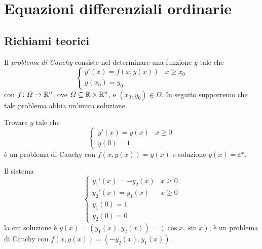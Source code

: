 \chapter{Equazioni differenziali ordinarie}

\section{Richiami teorici}
	
	\noindent Il \emph{problema di Cauchy} consiste nel determinare una funzione \(y\) tale che
	\begin{equation}\label{eq:problema-cauchy}
		\begin{cases}
			y' (x) = f (x, y(x)) & x \ge x_0 \\
			y (x_0) = y_0
		\end{cases}
	\end{equation}
	con \(f \colon \varOmega \to \mathbb{R}^n\), ove \(\varOmega \subseteq \mathbb{R} \times \mathbb{R}^n\), e \((x_0, y_0) \in \varOmega\). In seguito supporremo che tale problema abbia un'unica soluzione.
	
	\begin{esempio}
		Trovare \(y\) tale che
		\begin{equation*}
			\begin{cases}
				y' (x) = y (x) & x \ge 0 \\
				y (0) = 1
			\end{cases}
		\end{equation*}
		è un problema di Cauchy con \(f (x, y(x)) = y (x)\) e soluzione \(y (x) = \ee^x\).
	\end{esempio}

	\begin{esempio}
		Il sistema
		\begin{equation*}
			\begin{cases}
				y_1'(x) = - y_2 (x) & x \ge 0 \\
				y_2' (x) = y_1 (x) & x \ge 0 \\
				y_1 (0) = 1 \\
				y_2 (0) = 0
			\end{cases}
		\end{equation*}
		la cui soluzione è \(y (x) = (y_1 (x), y_2 (x)) = (\cos x, \sin x)\), è un problema di Cauchy con \(f (x, y (x)) = (- y_2 (x), y_1 (x))\).
	\end{esempio}

